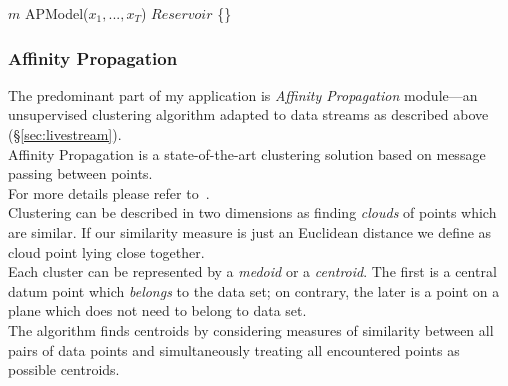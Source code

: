 \documentclass[11pt, letterpaper]{article}            %
\begin{document}
\SetAlCapSkip{1em}
\LinesNumbered
{}
\vspace{2cm}
\begin{algorithm}[h]

  $m$ \leftarrow APModel($x_1, ..., x_T$)\;
  $Reservoir$ \leftarrow \{\}\;

\end{algorithm}
\vspace{1cm}


\subsubsection{Affinity Propagation\label{sec:AfinProp}}
The predominant part of my application is \emph{Affinity Propagation} module---an unsupervised clustering algorithm adapted to data streams as described above (§\ref{sec:livestream}).\\
Affinity Propagation is a state-of-the-art clustering solution based on message passing between points.\\
For more details please refer to~\citep{frey07affinitypropagation}.\\

Clustering can be described in two dimensions as finding \emph{clouds} of points which are similar. If our similarity measure is just an Euclidean distance we define as cloud point lying close together.\\
Each cluster can be represented by a \emph{medoid} or a \emph{centroid}. The first is a central datum point which \emph{belongs} to the data set; on contrary, the later is a point on a plane which does not need to belong to data set.\\
The algorithm finds centroids by considering measures of similarity between all pairs of data points and simultaneously treating all encountered points as possible centroids.\\
\end{document}
